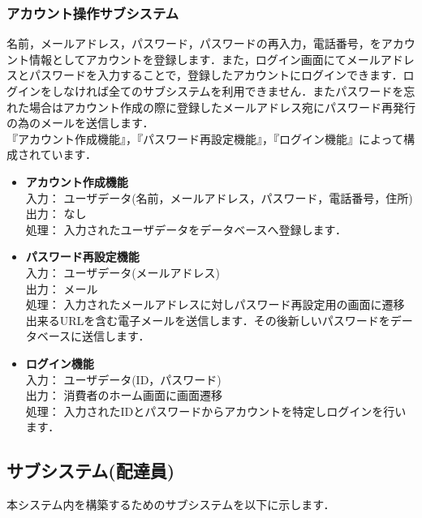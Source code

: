 \documentclass[a4j,titlepage]{jarticle}
\begin{document}
\subsubsection{アカウント操作サブシステム}
名前，メールアドレス，パスワード，パスワードの再入力，電話番号，をアカウント情報としてアカウントを登録します．また，ログイン画面にてメールアドレスとパスワードを入力することで，登録したアカウントにログインできます．ログインをしなければ全てのサブシステムを利用できません．またパスワードを忘れた場合はアカウント作成の際に登録したメールアドレス宛にパスワード再発行の為のメールを送信します． \\
『アカウント作成機能』，『パスワード再設定機能』，『ログイン機能』によって構成されています．
\begin{itemize}
\item \textbf{アカウント作成機能} \\
入力： ユーザデータ(名前，メールアドレス，パスワード，電話番号，住所) \\
出力： なし \\
処理： 入力されたユーザデータをデータベースへ登録します．
\item \textbf{パスワード再設定機能} \\
入力： ユーザデータ(メールアドレス) \\
出力： メール \\
処理： 入力されたメールアドレスに対しパスワード再設定用の画面に遷移出来るURLを含む電子メールを送信します．その後新しいパスワードをデータベースに送信します．
\item \textbf{ログイン機能} \\
入力： ユーザデータ(ID，パスワード) \\
出力： 消費者のホーム画面に画面遷移 \\
処理： 入力されたIDとパスワードからアカウントを特定しログインを行います．
\end{itemize}

\newpage

\subsection{サブシステム(配達員)}
本システム内を構築するためのサブシステムを以下に示します．
\end{document}
